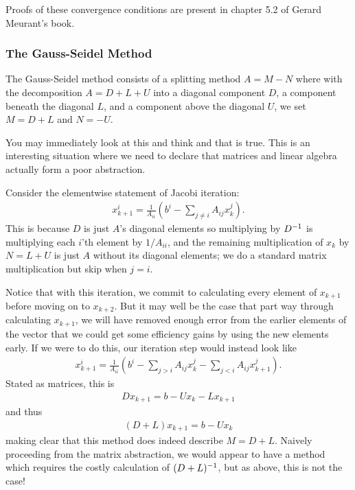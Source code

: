 \documentclass[11pt]{article}
\begin{document}
Proofs of these convergence conditions are present in chapter 5.2 of Gerard Meurant's book.

\subsubsection{The Gauss-Seidel Method}

The Gauss-Seidel method consists of a splitting method $A = M - N$ where with the decomposition $A = D + L + U$ into a diagonal component $D$, a component beneath the diagonal $L$, and a component above the diagonal $U$, we set $M = D + L$ and $N = -U$.

You may immediately look at this and think  and that is true. This is an interesting situation where we need to declare that matrices and linear algebra actually form a poor abstraction.

Consider the elementwise statement of Jacobi iteration: \begin{gather*}
x_{k+1}^i = \frac{1}{A_{ii}} \left( b^i - \sum_{j \neq i} A_{ij} x_k^j \right).
\end{gather*}
This is because $D$ is just $A$'s diagonal elements so multiplying by $D^{-1}$ is multiplying each $i$'th element by $1/A_{ii}$, and the remaining multiplication of $x_k$ by $N = L + U$ is just $A$ without its diagonal elements; we do a standard matrix multiplication but skip when $j=i$.

Notice that with this iteration, we commit to calculating every element of $x_{k+1}$ before moving on to $x_{k+2}$. But it may well be the case that part way through calculating $x_{k+1}$, we will have removed enough error from the earlier elements of the vector that we could get some efficiency gains by using the new elements early. If we were to do this, our iteration step would instead look like \begin{gather*}
x_{k+1}^i = \frac{1}{A_{ii}} \left( b^i - \sum_{j > i} A_{ij} x_k^j - \sum_{j < i} A_{ij} x_{k+1}^j \right).
\end{gather*}
Stated as matrices, this is \begin{gather*}
D x_{k+1} = b - Ux_k - Lx_{k+1}
\end{gather*}
and thus \begin{gather*}
(D +  L)x_{k+1} = b - Ux_k
\end{gather*}
making clear that this method does indeed describe $M = D + L$. Naively proceeding from the matrix abstraction, we would appear to have a method which requires the costly calculation of $(D + L)^{-1}$, but as above, this is not the case!
\end{document}
